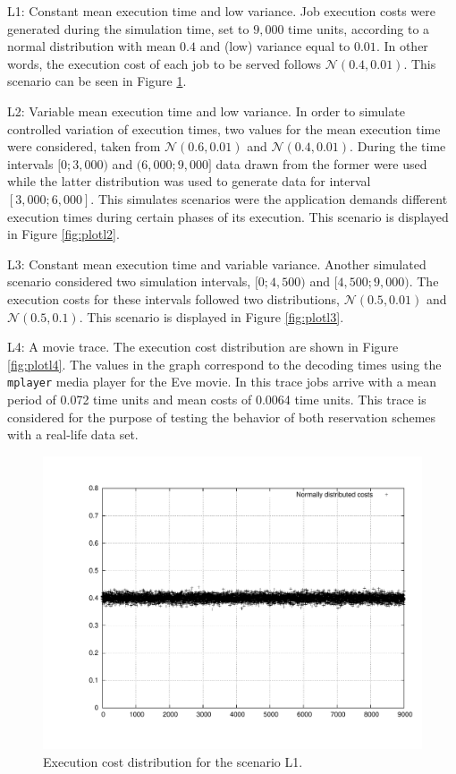 \documentclass[times, 10pt,twocolumn]{article}
\begin{document}
\begin{description}
\item L1: Constant mean execution time and low variance. Job execution
  costs were generated during the simulation time, set to $9,000$ time
  units, according to a normal distribution with mean $0.4$ and (low)
  variance equal to $0.01$. In other words, the execution cost of each
  job to be served follows $\mathcal{N}(0.4,0.01)$. This scenario can
  be seen in Figure \ref{fig:plotl1}.
\item L2: Variable mean execution time and low variance.  In order to
  simulate controlled variation of execution times, two values for the
  mean execution time were considered, taken from
  $\mathcal{N}(0.6,0.01)$ and $\mathcal{N}(0.4,0.01)$. During the time
  intervals $[0;3,000)$ and $(6,000;9,000]$ data drawn from the former
  were used while the latter distribution was used to
  generate data for interval $[3,000;6,000]$. This simulates scenarios
  were the application demands different execution times during
  certain phases of its execution. This scenario is displayed in
  Figure \ref{fig:plotl2}.
\item L3: Constant mean execution time and variable variance.  Another
  simulated scenario considered two simulation intervals, $[0;4,500)$
  and $[4,500;9,000)$.  The execution costs for these intervals
  followed two distributions, $\mathcal{N}(0.5,0.01)$ and
  $\mathcal{N}(0.5,0.1)$. This scenario is displayed in Figure
  \ref{fig:plotl3}.
\item L4: A movie trace. The execution cost distribution are shown in Figure
  \ref{fig:plotl4}. The values in the graph correspond to the decoding
  times using the \texttt{mplayer} media player for the Eve movie. In
  this trace jobs arrive with a mean period of 0.072 time units and
  mean costs of 0.0064 time units. This trace is considered for the
  purpose of testing the behavior of both reservation schemes with a
  real-life data set.
\end{description}

\begin{figure}[h!t]
  \centering
  \includegraphics[scale=0.31]{trace-normal}
  \caption{Execution cost distribution for the scenario L1.}
  \label{fig:plotl1}
\end{figure}
\end{document}
